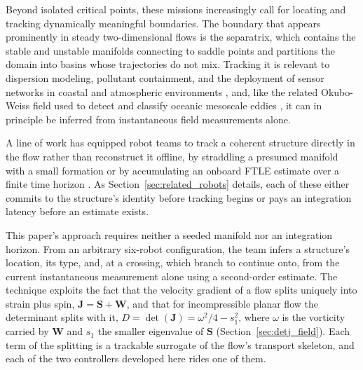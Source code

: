 \documentclass[lettersize,journal]{IEEEtran}
\begin{document}
Beyond isolated critical points, these missions increasingly call for
locating and tracking dynamically meaningful boundaries. The boundary
that appears prominently in steady two-dimensional flows is the
separatrix, which contains the stable and unstable manifolds connecting
to saddle points and partitions the domain into basins whose
trajectories do not mix. Tracking it is relevant to dispersion
modeling, pollutant containment, and the deployment of sensor networks
in coastal and atmospheric environments \cite{6,7,8}, and, like the
related Okubo-Weiss field used to detect and classify oceanic mesoscale
eddies \cite{5}, it can in principle be inferred from instantaneous
field measurements alone.

A line of work has equipped robot teams to track a coherent structure
directly in the flow rather than reconstruct it offline, by straddling a
presumed manifold with a small formation \cite{9,10,11,12} or by
accumulating an onboard FTLE estimate over a finite time horizon
\cite{13}. As Section~\ref{sec:related_robots} details, each of these
either commits to the structure's identity before tracking begins or
pays an integration latency before an estimate exists.

This paper's approach requires neither a seeded manifold nor an
integration horizon. From an arbitrary six-robot configuration, the
team infers a structure's location, its type, and, at a crossing, which
branch to continue onto, from the current instantaneous measurement
alone using a second-order estimate. The technique exploits the fact
that the velocity gradient of a flow splits uniquely into strain plus
spin, $\mathbf{J} = \mathbf{S} + \mathbf{W}$, and that for
incompressible planar flow the determinant splits with it, $D =
\det(\mathbf{J}) = \omega^2/4 - s_1^2$, where $\omega$ is the vorticity
carried by $\mathbf{W}$ and $s_1$ the smaller eigenvalue of $\mathbf{S}$
(Section~\ref{sec:detj_field}). Each term of the splitting is a
trackable surrogate of the flow's transport skeleton, and each of the
two controllers developed here rides one of them.
\end{document}
